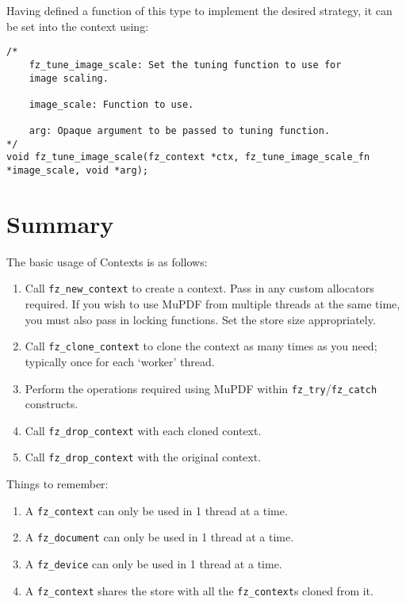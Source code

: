 \documentclass[oneside]{book}
\begin{document}
Having defined a function of this type to implement the desired strategy, it can be set into the context using:

\begin{lstlisting}
/*
	fz_tune_image_scale: Set the tuning function to use for
	image scaling.

	image_scale: Function to use.

	arg: Opaque argument to be passed to tuning function.
*/
void fz_tune_image_scale(fz_context *ctx, fz_tune_image_scale_fn *image_scale, void *arg);
\end{lstlisting}


\section{Summary}

The basic usage of Contexts is as follows:

\begin{enumerate}
\item Call \texttt{fz\_new\_context} to create a context. Pass in any custom allocators required. If you wish to use MuPDF from multiple threads at the same time, you must also pass in locking functions. Set the store size appropriately.
\item Call \texttt{fz\_clone\_context} to clone the context as many times as you need; typically once for each `worker' thread.
\item Perform the operations required using MuPDF within \texttt{fz\_try}/\texttt{fz\_catch} constructs.
\item Call \texttt{fz\_drop\_context} with each cloned context.
\item Call \texttt{fz\_drop\_context} with the original context.
\end{enumerate}

Things to remember:

\begin{enumerate}
\item A \texttt{fz\_context} can only be used in 1 thread at a time.
\item A \texttt{fz\_document} can only be used in 1 thread at a time.
\item A \texttt{fz\_device} can only be used in 1 thread at a time.
\item A \texttt{fz\_context} shares the store with all the \texttt{fz\_context}s cloned from it.
\end{enumerate}
\end{document}
